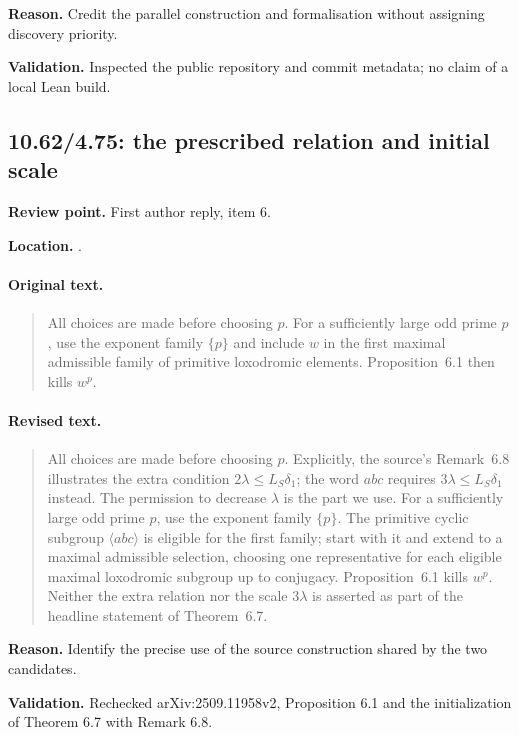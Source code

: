 \noindent\textbf{Reason.} Credit the parallel construction and formalisation without assigning discovery priority.

\noindent\textbf{Validation.} Inspected the public repository and commit metadata; no claim of a local Lean build.

\subsection{10.62/4.75: the prescribed relation and initial scale}
\noindent\textbf{Review point.} First author reply, item 6.\par
\noindent\textbf{Location.} .

\paragraph{Original text.}
\begin{quote}\small
All choices are made before choosing \(p\).
For a sufficiently large odd prime \(p\), use the exponent family
\(\{p\}\) and include \(w\) in the first maximal admissible family
of primitive loxodromic elements.
Proposition~6.1 then kills \(w^p\).
\end{quote}

\paragraph{Revised text.}
\begin{quote}\small
All choices are made before choosing \(p\).
Explicitly, the source's Remark~6.8 illustrates the extra condition
\(2\lambda\le L_S\delta_1\); the word \(abc\) requires
\(3\lambda\le L_S\delta_1\) instead. The permission to decrease
\(\lambda\) is the part we use. For a sufficiently large odd prime
\(p\), use the exponent family \(\{p\}\). The primitive cyclic
subgroup \(\langle abc\rangle\) is eligible for the first family;
start with it and extend to a maximal admissible selection, choosing
one representative for each eligible maximal loxodromic subgroup
up to conjugacy. Proposition~6.1 kills \(w^p\).
Neither the extra relation nor the scale \(3\lambda\) is asserted
as part of the headline statement of Theorem~6.7.
\end{quote}

\noindent\textbf{Reason.} Identify the precise use of the source construction shared by the two candidates.

\noindent\textbf{Validation.} Rechecked arXiv:2509.11958v2, Proposition 6.1 and the initialization of Theorem 6.7 with Remark 6.8.

